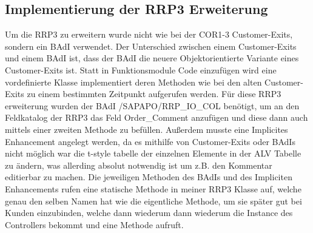 \subsection{Implementierung der RRP3 Erweiterung}
\label{sec:Implementierung der RRP3 Erweiterung}   
Um die RRP3 zu erweitern wurde nicht wie bei der COR1-3 Customer-Exits, sondern ein \ac{BAdI} verwendet. Der Unterschied zwischen einem Customer-Exits und einem \ac{BAdI} ist, dass der \ac{BAdI} die neuere Objektorientierte Variante eines Customer-Exits ist. Statt in Funktionsmodule Code einzufügen wird eine vordefinierte Klasse implementiert deren Methoden wie bei den alten Customer-Exits zu einem bestimmten Zeitpunkt aufgerufen werden. Für diese RRP3 erweiterung wurden der \ac{BAdI} /SAPAPO/RRP\_IO\_COL benötigt, um an den Feldkatalog der RRP3 das Feld Order\_Comment anzufügen und diese dann auch mittels einer zweiten Methode zu befüllen. Außerdem musste eine Implicites Enhancement angelegt werden, da es mithilfe von Customer-Exits oder \ac{BAdI}s nicht möglich war die t-style tabelle der einzelnen Elemente in der \ac{ALV} Tabelle zu ändern, was allerding absolut notwendig ist um z.B. den Kommentar editierbar zu machen. Die jeweiligen Methoden des \ac{BAdI}s und des Impliciten Enhancements rufen eine statische Methode in meiner RRP3 Klasse auf, welche genau den selben Namen hat wie die eigentliche Methode, um sie später gut bei Kunden einzubinden, welche dann wiederum dann wiederum die Instance des Controllers bekommt und eine Methode aufruft.

